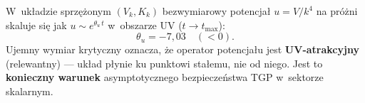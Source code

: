 \begin{proposition}%
\label{prop:M-theta-coupled}
W~uk\l{}adzie sprz\k{e}\.zonym $(V_k, K_k)$
bezwymiarowy potencja\l{} $u = V/k^4$ na pr\'o\.zni
skaluje si\k{e} jak $u \sim e^{\theta_u\,t}$
w~obszarze UV ($t \to t_{\mathrm{max}}$):
\begin{equation}
  \theta_u = -7{,}03 \quad (< 0).
\end{equation}
Ujemny wymiar krytyczny oznacza, \.ze operator potencja\l{}u
jest \textbf{UV-atrakcyjny} (relewantny) ---
uk\l{}ad p\l{}ynie ku punktowi sta\l{}emu, nie od niego.
Jest to \textbf{konieczny warunek} asymptotycznego bezpiecze\'nstwa
TGP w~sektorze skalarnym.
\end{proposition}
